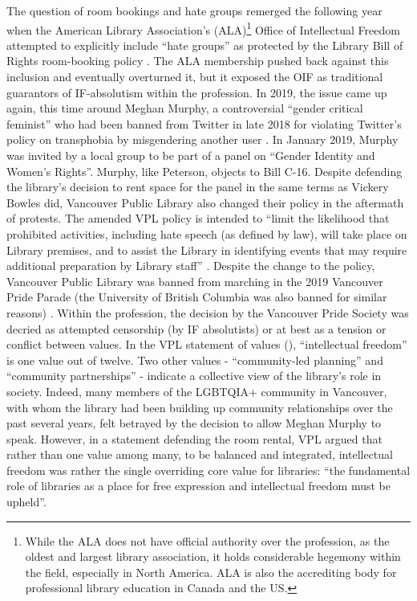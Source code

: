 \documentclass[12pt,oneside]{memoir}
\begin{document}
The question of room bookings and hate groups remerged the following year when the American Library Association's (ALA)\footnote{While the ALA does not have official authority over the profession, as the oldest and largest library association, it holds considerable hegemony within the field, especially in North America. ALA is also the accrediting body for professional library education in Canada and the US.} Office of Intellectual Freedom attempted to explicitly include ``hate groups'' as protected by the Library Bill of Rights room-booking policy \cite{yorio-peet-2018}. The ALA membership pushed back against this inclusion and eventually overturned it, but it exposed the OIF as traditional guarantors of IF-absolutism within the profession. In 2019, the issue came up again, this time around Meghan Murphy, a controversial ``gender critical feminist'' who had been banned from Twitter in late 2018 for violating Twitter's policy on transphobia by misgendering another user \cite{brean-2019}. In January 2019, Murphy was invited by a local group to be part of a panel on ``Gender Identity and Women's Rights''. Murphy, like Peterson, objects to Bill C-16. Despite defending the library's decision to rent space for the panel in the same terms as Vickery Bowles did, Vancouver Public Library also changed their policy in the aftermath of protests. The amended VPL policy is intended to ``limit the likelihood that prohibited activities, including hate speech (as defined by law), will take place on Library premises, and to assist the Library in identifying events that may require additional preparation by Library staff'' \cite{vpl-policy}.
Despite the change to the policy, Vancouver Public Library was banned from marching in the 2019 Vancouver Pride Parade (the University of British Columbia was also banned for similar reasons) \cite{cbc-vpl, cbc-ubc}. Within the profession, the decision by the Vancouver Pride Society was decried as attempted censorship (by IF absolutists) or at best as a tension or conflict between values. In the VPL statement of values (\cite{vpl-values}), ``intellectual freedom'' is one value out of twelve. Two other values - ``community-led planning'' and ``community partnerships'' - indicate a collective view of the library's role in society. Indeed, many members of the LGBTQIA+ community in Vancouver, with whom the library had been building up community relationships over the past several years, felt betrayed by the decision to allow Meghan Murphy to speak. However, in a statement defending the room rental, VPL argued that rather than one value among many, to be balanced and integrated, intellectual freedom was rather the single overriding core value for libraries: ``the fundamental role of libraries as a place for free expression and intellectual freedom must be upheld''.
\end{document}
